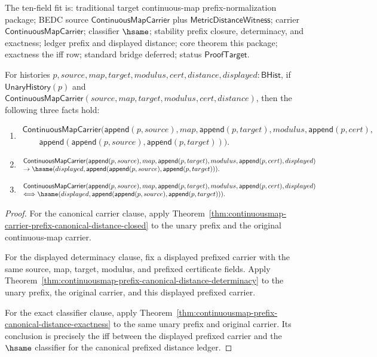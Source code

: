 \begin{theorem}
\label{thm:continuousmap-prefixed-canonical-distance-package}
The ten-field fit is: traditional target continuous-map prefix-normalization
package; BEDC source $\mathsf{ContinuousMapCarrier}$ plus
$\mathsf{MetricDistanceWitness}$; carrier $\mathsf{ContinuousMapCarrier}$;
classifier $\hsame$; stability prefix closure, determinacy, and exactness;
ledger prefix and displayed distance; core theorem this package; exactness the
iff row; standard bridge deferred; status $\mathsf{ProofTarget}$.

For histories
$p,source,map,target,modulus,cert,distance,displayed:\mathsf{BHist}$, if
$\mathsf{UnaryHistory}(p)$ and
$\mathsf{ContinuousMapCarrier}(source,map,target,modulus,cert,distance)$,
then the following three facts hold:
\begin{enumerate}
\item
$$
\begin{array}{l}
\mathsf{ContinuousMapCarrier}
(\mathsf{append}(p,source),map,\mathsf{append}(p,target),modulus,
\mathsf{append}(p,cert),\\
\qquad \mathsf{append}(\mathsf{append}(p,source),\mathsf{append}(p,target))).
\end{array}
$$
\item
$$
\begin{array}{l}
\mathsf{ContinuousMapCarrier}
(\mathsf{append}(p,source),map,\mathsf{append}(p,target),modulus,
\mathsf{append}(p,cert),displayed)\\
\to
\hsame(displayed,
\mathsf{append}(\mathsf{append}(p,source),\mathsf{append}(p,target))).
\end{array}
$$
\item
$$
\begin{array}{l}
\mathsf{ContinuousMapCarrier}
(\mathsf{append}(p,source),map,\mathsf{append}(p,target),modulus,
\mathsf{append}(p,cert),displayed)\\
\Longleftrightarrow
\hsame(displayed,
\mathsf{append}(\mathsf{append}(p,source),\mathsf{append}(p,target))).
\end{array}
$$
\end{enumerate}
\end{theorem}
\begin{proof}
For the canonical carrier clause, apply
Theorem~\ref{thm:continuousmap-carrier-prefix-canonical-distance-closed} to
the unary prefix and the original continuous-map carrier.

For the displayed determinacy clause, fix a displayed prefixed carrier with the
same source, map, target, modulus, and prefixed certificate fields. Apply
Theorem~\ref{thm:continuousmap-prefix-canonical-distance-determinacy} to the
unary prefix, the original carrier, and this displayed prefixed carrier.

For the exact classifier clause, apply
Theorem~\ref{thm:continuousmap-prefix-canonical-distance-exactness} to the
same unary prefix and original carrier. Its conclusion is precisely the iff
between the displayed prefixed carrier and the $\hsame$ classifier for the
canonical prefixed distance ledger.
\end{proof}

